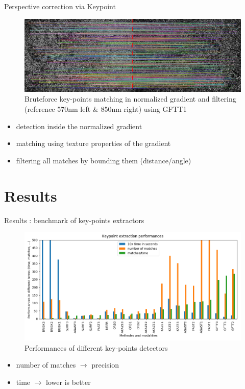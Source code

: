 \documentclass{beamer}
\begin{document}
		\begin{frame}{Perspective correction via Keypoint}
			\begin{figure}
				\includegraphics[width=\linewidth]{../figures/prespective-feature-matching}
				\caption{Bruteforce key-points matching in normalized gradient and filtering (reference 570nm left \& 850nm right) using GFTT1}
			\end{figure}
		
			\begin{itemize}
				\item detection inside the normalized gradient
				\item matching using texture properties of the gradient
				\item filtering all matches by bounding them (distance/angle)
			\end{itemize}
		\end{frame}
	
	\section{Results}
	
		\begin{frame}{Results : benchmark of key-points extractors}
			\begin{figure}
				\includegraphics[width=\linewidth]{../figures/comparaison-keypoint-performances}
				\caption{Performances of different key-points detectors}
			\end{figure}
			\vspace{-1em}
			\begin{itemize}
				\item number of matches $\rightarrow$ precision
				\item time $\rightarrow$ lower is better
			\end{itemize}
		\end{frame}
	
\end{document}
